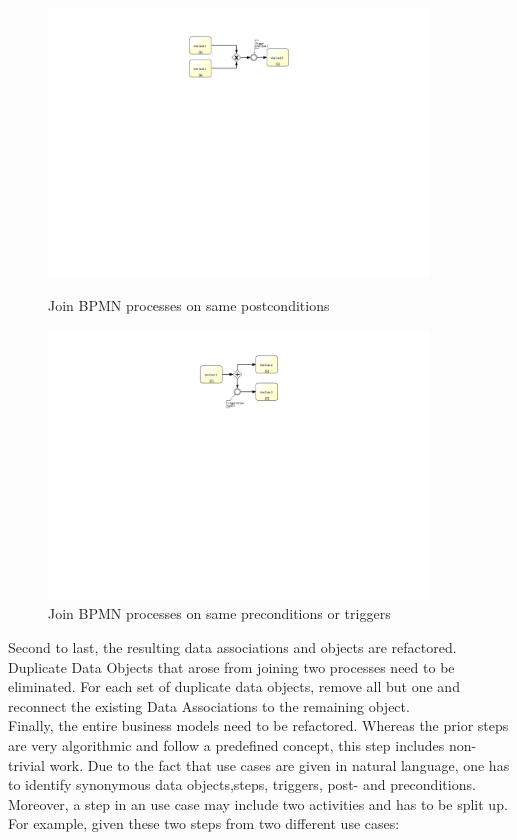 \begin{figure}[h!]
	\centering
	\begin{minipage}{0.45\textwidth}
		\centering
		\includegraphics[width=0.9\textwidth, trim={11cm 15cm 12cm 1cm}]{img/JoinBPMNpostcondition.pdf} %
		\caption{Join BPMN processes on same postconditions}
		\label{fig:JoinBPMNPostcondition} %
	\end{minipage}\hfill
	\begin{minipage}{0.45\textwidth}
		\centering
		\includegraphics[width=0.9\textwidth, trim={11cm 15cm 12cm 1cm}]{img/JoinBPMNPrecondition} %
		\caption{Join BPMN processes on same preconditions or triggers}
		\label{fig:JoinBPMNPrecondition}
	\end{minipage}
\end{figure}
Second to last, the resulting data associations and objects are refactored. Duplicate Data Objects that arose from joining two processes need to be eliminated. For each set of duplicate data objects, remove all but one and reconnect the existing Data Associations to the remaining object. \\ Finally, the entire business models need to be refactored. Whereas the prior steps are very algorithmic and follow a predefined concept, this step includes non-trivial work. Due to the fact that use cases are given in natural language, one has to identify synonymous data objects,steps, triggers, post- and preconditions. Moreover, a step in an use case may include two activities and has to be split up. For example, given these two steps from two different use cases:
